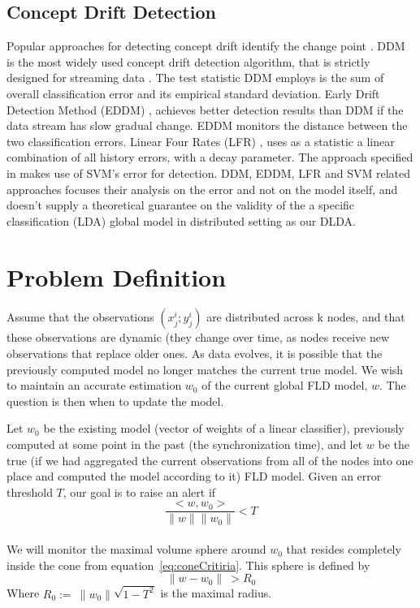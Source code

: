 \documentclass[11pt,twocolumn,varwidth=true,a4paper,fleqn]{article}
\begin{document}
\subsection{Concept Drift Detection}

Popular approaches for detecting concept drift identify the change point
\cite{gama2004learning,wang2013concept}. DDM is the most widely used
concept drift detection algorithm, that is strictly designed for streaming 
data \cite{gama2004learning}. The test statistic DDM employs is the sum of 
overall classification error and its empirical standard deviation. Early Drift
Detection Method (EDDM) \cite{baena2006early}, achieves better detection results than DDM if the data stream has slow gradual change.
EDDM monitors the distance between the two classification errors. Linear Four Rates (LFR) \cite{wang2015concept}, uses as a statistic a linear
combination of all history errors, with a decay parameter. The approach specified in \cite{klinkenberg2000detecting,dries2009adaptive} makes use of SVM's error 
for detection. DDM, EDDM, LFR and SVM related approaches focuses their analysis on the error
and not on the model itself, and doesn't supply a theoretical guarantee on the validity of the
a specific classification (LDA) global model in distributed setting as our DLDA.

 

\section{Problem Definition}
Assume that the observations ${(x^i_j; y^i_j)}$ are distributed across k nodes, 
and that these observations are dynamic (they change over time, as nodes receive 
new observations that replace older ones. As data evolves, it is possible that the
previously computed model no longer matches the current true model. We wish to maintain 
an accurate estimation $w_0$ of the current global FLD model, $w$. 
The question is then when to update the model.

Let $w_0$ be the existing model (vector of weights of a linear classifier), 
previously computed at some point in the past (the synchronization time), 
and let $w$ be the true (if we had aggregated the current observations 
from all of the nodes into one place and computed the model according to it) FLD model. 
Given an error threshold $T$, our goal is to raise an alert if
\begin{equation} \label{eq:coneCritiria}
\frac{<w,w_0>}{\parallel w \parallel \parallel w_0 \parallel}  < T
\end{equation}
\\We will monitor the maximal volume sphere around $w_0$ that resides completely
inside the cone from equation~\ref{eq:coneCritiria}. This sphere is
defined by
\begin{equation} \label{eq:critiria}
\parallel w-w_0 \parallel \  >  R_0
\end{equation}
Where $R_0 := \  \parallel w_0 \parallel \sqrt{1-T^2}$ is the maximal radius.
\end{document}
